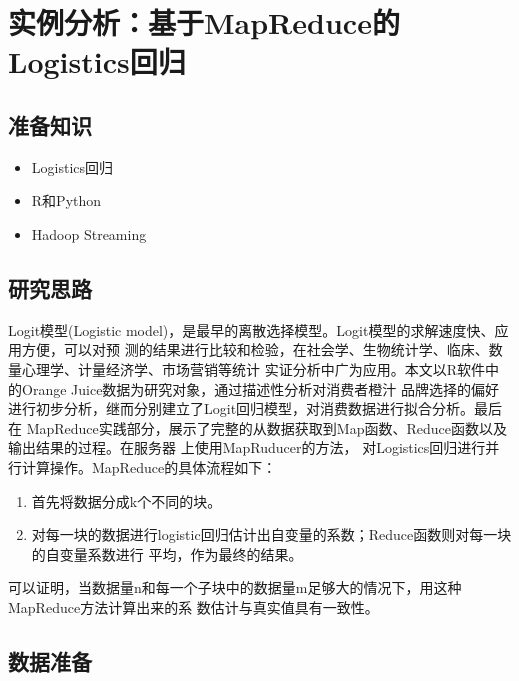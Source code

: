 \section{实例分析：基于MapReduce的Logistics回归}\label{ux5b9eux4f8bux5206ux6790ux57faux4e8emapreduceux7684logisticsux56deux5f52}

\subsection{准备知识}\label{ux51c6ux5907ux77e5ux8bc6}

\begin{itemize}
\itemsep1pt\parskip0pt
\item
  Logistics回归
\item
  R和Python
\item
  Hadoop Streaming
\end{itemize}

\subsection{研究思路}\label{ux7814ux7a76ux601dux8def}

Logit模型(Logistic
model)，是最早的离散选择模型。Logit模型的求解速度快、应用方便，可以对预
测的结果进行比较和检验，在社会学、生物统计学、临床、数量心理学、计量经济学、市场营销等统计
实证分析中广为应用。本文以R软件中的Orange
Juice数据为研究对象，通过描述性分析对消费者橙汁
品牌选择的偏好进行初步分析，继而分别建立了Logit回归模型，对消费数据进行拟合分析。最后在
MapReduce实践部分，展示了完整的从数据获取到Map函数、Reduce函数以及输出结果的过程。在服务器
上使用MapRuducer的方法，
对Logistics回归进行并行计算操作。MapReduce的具体流程如下：

\begin{enumerate}
\def\labelenumi{\arabic{enumi}.}
\item
  首先将数据分成k个不同的块。
\item
  对每一块的数据进行logistic回归估计出自变量的系数；Reduce函数则对每一块的自变量系数进行
  平均，作为最终的结果。
\end{enumerate}

可以证明，当数据量n和每一个子块中的数据量m足够大的情况下，用这种MapReduce方法计算出来的系
数估计与真实值具有一致性。

\subsection{数据准备}\label{ux6570ux636eux51c6ux5907}

